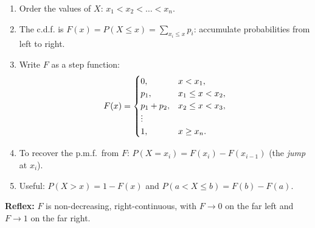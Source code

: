 \documentclass[11pt]{article}
\newcommand{\cle}[1]{{\popxbold\color{popdark}#1}}
\def\vdots{\mathord{\vbox{\baselineskip3.2pt\lineskiplimit0pt\kern4pt\hbox{.}\hbox{.}\hbox{.}}}}%
\begin{document}
\begin{methode}
\begin{enumerate}
\item Order the values of $X$: $x_1 < x_2 < \dots < x_n$.
\item The \cle{c.d.f.} is $F(x) = P(X \leq x) = \sum_{x_i \leq x} p_i$: accumulate probabilities from left to right.
\item Write $F$ as a \cle{step function}:
\[
F(x) = \begin{cases} 0, & x < x_1, \\ p_1, & x_1 \leq x < x_2, \\ p_1 + p_2, & x_2 \leq x < x_3, \\ \vdots & \\ 1, & x \geq x_n. \end{cases}
\]
\item To recover the p.m.f.\ from $F$: $P(X = x_i) = F(x_i) - F(x_{i-1})$ (the \emph{jump} at $x_i$).
\item Useful: $P(X > x) = 1 - F(x)$ and $P(a < X \leq b) = F(b) - F(a)$.
\end{enumerate}
\textbf{Reflex:} $F$ is non-decreasing, right-continuous, with $F \to 0$ on the far left and $F \to 1$ on the far right.
\end{methode}
\end{document}
